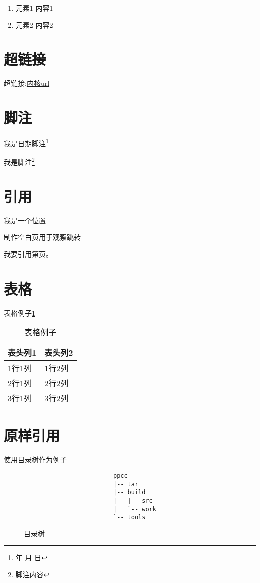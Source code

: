 \documentclass[12pt,a4paper]{article}
\renewcommand{\today}{\number\year 年 \number\month 月 \number\day 日}
\begin{document}
\begin{enumerate}
    \item 元素1
        内容1
    \item 元素2
        内容2
\end{enumerate}

\section{超链接} 
超链接:\href{http://ftp.kernel.org/pub/linux/kernel/v3.x/}{内核url}

\section{脚注} 
我是日期脚注\footnote{\today}

我是脚注\footnote{脚注内容}

\section{引用} 
我是一个位置\label{标签1}

制作空白页用于观察跳转
\newpage

我要引用第\pageref{标签1}页。

\section{表格} 
表格例子\ref{表格例子}
\begin{table}[!hbp]
\begin{center}
    \begin{tabular}{|l|l|}
        \hline
        表头列1 & 表头列2 \\
        \hline
        1行1列 & 1行2列 \\
        \hline
        2行1列 & 2行2列 \\
        \hline
        3行1列 & 3行2列 \\
        \hline
    \end{tabular}
    \caption{表格例子\label{表格例子}}
\end{center}
\end{table}

\section{原样引用}
使用目录树作为例子
\setlength{\unitlength}{1mm}
\begin{figure}[!hbp]
\begin{verbatim}
                         ppcc
                         |-- tar
                         |-- build
                         |   |-- src
                         |   `-- work
                         `-- tools
\end{verbatim}
\caption{目录树\label{目录树}}
\end{figure}
\end{document}
